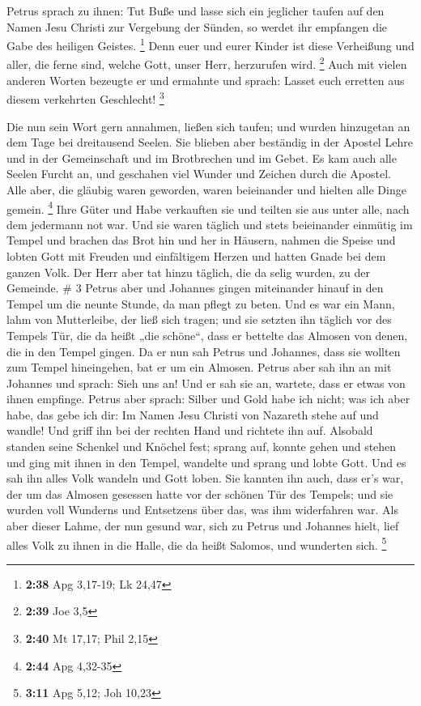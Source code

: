  Petrus sprach zu ihnen: Tut Buße und lasse sich ein
jeglicher taufen auf den Namen Jesu Christi zur Vergebung der Sünden, so
werdet ihr empfangen die Gabe des heiligen Geistes. \footnote{\textbf{2:38}
  Apg 3,17-19; Lk 24,47}  Denn euer und eurer Kinder ist
diese Verheißung und aller, die ferne sind, welche Gott, unser Herr,
herzurufen wird. \footnote{\textbf{2:39} Joe 3,5}  Auch mit
vielen anderen Worten bezeugte er und ermahnte und sprach: Lasset euch
erretten aus diesem verkehrten Geschlecht! \footnote{\textbf{2:40} Mt
  17,17; Phil 2,15}

 Die nun sein Wort gern annahmen, ließen sich taufen; und
wurden hinzugetan an dem Tage bei dreitausend Seelen.  Sie
blieben aber beständig in der Apostel Lehre und in der Gemeinschaft und
im Brotbrechen und im Gebet.  Es kam auch alle Seelen
Furcht an, und geschahen viel Wunder und Zeichen durch die Apostel.
 Alle aber, die gläubig waren geworden, waren beieinander
und hielten alle Dinge gemein. \footnote{\textbf{2:44} Apg 4,32-35}
 Ihre Güter und Habe verkauften sie und teilten sie aus
unter alle, nach dem jedermann not war.  Und sie waren
täglich und stets beieinander einmütig im Tempel und brachen das Brot
hin und her in Häusern,  nahmen die Speise und lobten Gott
mit Freuden und einfältigem Herzen und hatten Gnade bei dem ganzen Volk.
Der Herr aber tat hinzu täglich, die da selig wurden, zu der Gemeinde.
\# 3  Petrus aber und Johannes gingen miteinander hinauf in
den Tempel um die neunte Stunde, da man pflegt zu beten. 
Und es war ein Mann, lahm von Mutterleibe, der ließ sich tragen; und sie
setzten ihn täglich vor des Tempels Tür, die da heißt „die schöne``,
dass er bettelte das Almosen von denen, die in den Tempel gingen.
 Da er nun sah Petrus und Johannes, dass sie wollten zum
Tempel hineingehen, bat er um ein Almosen.  Petrus aber sah
ihn an mit Johannes und sprach: Sieh uns an!  Und er sah sie
an, wartete, dass er etwas von ihnen empfinge.  Petrus aber
sprach: Silber und Gold habe ich nicht; was ich aber habe, das gebe ich
dir: Im Namen Jesu Christi von Nazareth stehe auf und wandle!
 Und griff ihn bei der rechten Hand und richtete ihn auf.
Alsobald standen seine Schenkel und Knöchel fest;  sprang
auf, konnte gehen und stehen und ging mit ihnen in den Tempel, wandelte
und sprang und lobte Gott.  Und es sah ihn alles Volk
wandeln und Gott loben.  Sie kannten ihn auch, dass er's
war, der um das Almosen gesessen hatte vor der schönen Tür des Tempels;
und sie wurden voll Wunderns und Entsetzens über das, was ihm
widerfahren war.  Als aber dieser Lahme, der nun gesund
war, sich zu Petrus und Johannes hielt, lief alles Volk zu ihnen in die
Halle, die da heißt Salomos, und wunderten sich. \footnote{\textbf{3:11}
  Apg 5,12; Joh 10,23}

